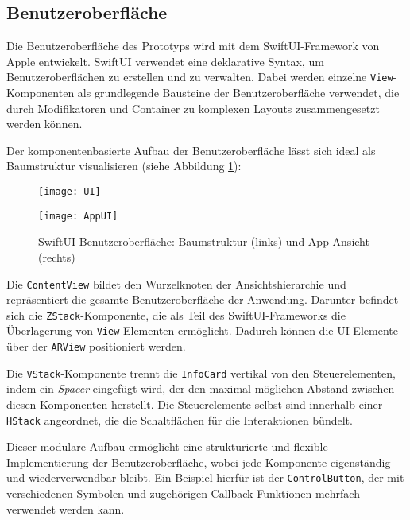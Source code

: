 \subsection{Benutzeroberfläche}

Die Benutzeroberfläche des Prototyps wird mit dem SwiftUI-Framework von Apple entwickelt. SwiftUI verwendet eine deklarative Syntax, um Benutzeroberflächen zu erstellen und zu verwalten. Dabei werden einzelne \texttt{View}-Komponenten als grundlegende Bausteine der Benutzeroberfläche verwendet, die durch Modifikatoren und Container zu komplexen Layouts zusammengesetzt werden können. \cite{appledevdoc}

Der komponentenbasierte Aufbau der Benutzeroberfläche lässt sich ideal als Baumstruktur visualisieren (siehe Abbildung \ref{fig:AppUI}):

\begin{figure}[ht]
    \centering
    \begin{minipage}{0.45\textwidth}
        \centering
        \texttt{[image: UI]}
    \end{minipage}
    \hfill
    \begin{minipage}{0.45\textwidth}
        \centering
        \texttt{[image: AppUI]}
    \end{minipage}
    \caption{SwiftUI-Benutzeroberfläche: Baumstruktur (links) und App-Ansicht (rechts)}
    \label{fig:AppUI}
\end{figure}

Die \texttt{ContentView} bildet den Wurzelknoten der Ansichtshierarchie und repräsentiert die gesamte Benutzeroberfläche der Anwendung. Darunter befindet sich die \texttt{ZStack}-Komponente, die als Teil des SwiftUI-Frameworks die Überlagerung von \texttt{View}-Elementen ermöglicht. Dadurch können die UI-Elemente über der \texttt{ARView} positioniert werden.

Die \texttt{VStack}-Komponente trennt die \texttt{InfoCard} vertikal von den Steuerelementen, indem ein \textit{Spacer} eingefügt wird, der den maximal möglichen Abstand zwischen diesen Komponenten herstellt. Die Steuerelemente selbst sind innerhalb einer \texttt{HStack} angeordnet, die die Schaltflächen für die Interaktionen bündelt.

Dieser modulare Aufbau ermöglicht eine strukturierte und flexible Implementierung der Benutzeroberfläche, wobei jede Komponente eigenständig und wiederverwendbar bleibt. Ein Beispiel hierfür ist der \texttt{ControlButton}, der mit verschiedenen Symbolen und zugehörigen Callback-Funktionen mehrfach verwendet werden kann.

